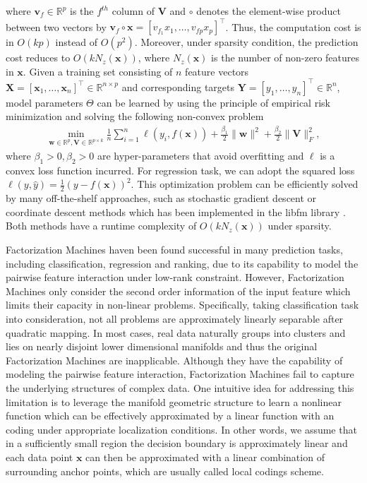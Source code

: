 \documentclass{article}
\def \x {\mathbf{x}}
\def \Y {\mathbf{Y}}
\def \X {\mathbf{X}}
\def \w {\mathbf{w}}
\def \v {\mathbf{v}}
\def \V {\mathbf{V}}
\begin{document}
where $\v_f\in\mathbb{R}^p$ is the $f^{th}$ column of $\V$ and $\circ$ denotes the element-wise product between two vectors by $\v_f \circ \x = [v_{f_1}x_1,\dots,v_{fp}x_p]^\top$. Thus, the computation cost is in $O(kp)$ instead of $O(p^2)$. Moreover, under sparsity condition, the prediction cost reduces to $O(kN_z(\x))$, where $N_z(\x)$ is the number of non-zero features in $\x$. Given a training set consisting of $n$ feature vectors $\X = [\x_1,\dots,\x_n]^\top \in \mathbb{R}^{n\times p}$ and corresponding targets $\Y = [y_1,\dots,y_n]^\top \in \mathbb{R}^n$, model parameters $\Theta$ can be learned by using the principle of empirical risk minimization and solving the following non-convex problem
\begin{align}
\min\limits_{\w \in \mathbb{R}^p,\V\in\mathbb{R}^{p\times k}} \frac{1}{n}\sum^n_{i=1}\ell(y_i,f(\x))+\frac{\beta_1}{2}\|\w\|^2+\frac{\beta_2}{2}\|\V\|^2_F,
\end{align}
where $\beta_1 >0,\beta_2>0$ are hyper-parameters that avoid overfitting and $\ell$ is a convex loss function incurred. For regression task, we can adopt the squared loss $\ell(y,\hat{y})=\frac{1}{2}(y-f(\x))^2$. This optimization problem can be efficiently solved by many off-the-shelf approaches, such as stochastic gradient descent or coordinate descent methods which has been implemented in the libfm library \cite{rendle2012factorization}. Both methods have a runtime complexity of $O(kN_z(\x))$ under sparsity.

Factorization Machines haven been found successful in many prediction tasks, including classification, regression and ranking, due to its capability to model the pairwise feature interaction under low-rank constraint. However, Factorization Machines only consider the second order information of the input feature which limits their capacity in non-linear problems. Specifically, taking classification task into consideration, not all problems are approximately linearly separable after quadratic mapping. In most cases, real data naturally groups into clusters and lies on nearly disjoint lower dimensional manifolds and thus the original Factorization Machines are inapplicable. Although they have the capability of modeling the pairwise feature interaction, Factorization Machines  fail to capture the underlying structures of complex data. One intuitive idea for addressing this limitation is to leverage the manifold geometric structure to learn a nonlinear function which can be effectively approximated by a linear function with an coding under appropriate localization conditions. In other words, we assume that in a sufficiently small region the decision boundary is approximately linear and each data point $\x$ can then be approximated with a linear combination of surrounding anchor points, which are usually called local codings scheme.
\end{document}
